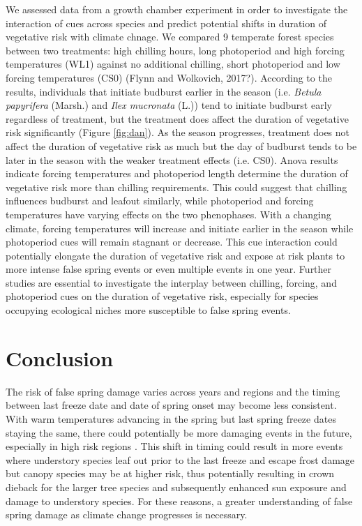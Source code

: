 \documentclass{article}\usepackage[]{graphicx}\usepackage[]{color}
\begin{document}
We assessed data from a growth chamber experiment in order to investigate the interaction of cues across species and predict potential shifts in duration of vegetative risk with climate chnage. We compared 9 temperate forest species between two treatments: high chilling hours, long photoperiod and high forcing temperatures (WL1) against no additional chilling, short photoperiod and low forcing temperatures (CS0) (Flynn and Wolkovich, 2017?). According to the results, individuals that initiate budburst earlier in the season (i.e. {\textit {Betula papyrifera}} (Marsh.) and {\textit{Ilex mucronata}} (L.)) tend to initiate budburst early regardless of treatment, but the treatment does affect the duration of vegetative risk significantly (Figure \ref{fig:dan}). As the season progresses, treatment does not affect the duration of vegetative risk as much but the day of budburst tends to be later in the season with the weaker treatment effects (i.e. CS0). Anova results indicate forcing temperatures and photoperiod length determine the duration of vegetative risk more than chilling requirements. This could suggest that chilling influences budburst and leafout similarly, while photoperiod and forcing temperatures have varying effects on the two phenophases. With a changing climate, forcing temperatures will increase and initiate earlier in the season while photoperiod cues will remain stagnant or decrease. This cue interaction could potentially elongate the duration of vegetative risk and expose at risk plants to more intense false spring events or even multiple events in one year. Further studies are essential to investigate the interplay between chilling, forcing, and photoperiod cues on the duration of vegetative risk, especially for species occupying ecological niches more susceptible to false spring events. 

\section{Conclusion}
The risk of false spring damage varies across years and regions and the timing between last freeze date and date of spring onset may become less consistent. With warm temperatures advancing in the spring but last spring freeze dates staying the same, there could potentially be more damaging events in the future, especially in high risk regions \citep{Gu2008, Inouye2008}. This shift in timing could result in more events where understory species leaf out prior to the last freeze and escape frost damage but canopy species may be at higher risk, thus potentially resulting in crown dieback for the larger tree species and subsequently enhanced sun exposure and damage to understory species. For these reasons, a greater understanding of false spring damage as climate change progresses is necessary.
\end{document}
